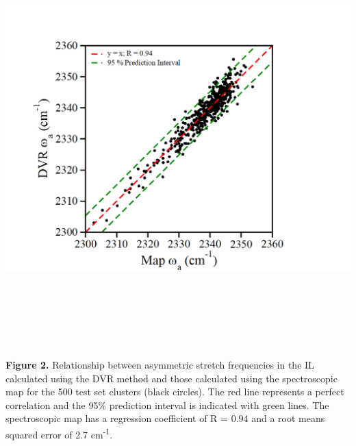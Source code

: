 \documentclass[]{article}
\begin{document}
\includegraphics[width=6.22356in,height=6.29517in]{figure2.png}

\textbf{Figure 2.} Relationship between  asymmetric stretch frequencies in the \ce{[C4C1im][PF6]} IL calculated using the DVR method and those calculated using the spectroscopic map for the 500 test set clusters (black circles). The red line represents a perfect correlation and the 95\% prediction interval is indicated with green lines. The spectroscopic map has a regression coefficient of R = 0.94 and a root means squared error of 2.7 cm\textsuperscript{-1}.
\end{document}
